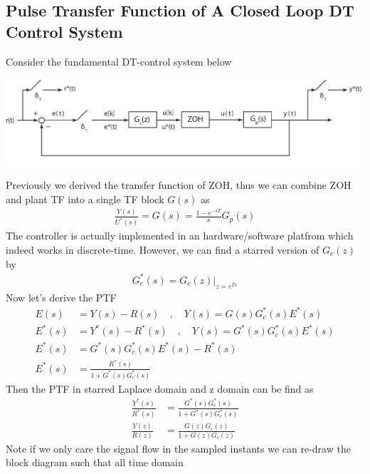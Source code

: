 \documentclass[twoside]{article}
\begin{document}
\subsection*{Pulse Transfer Function of A Closed Loop DT Control
  System}

Consider the fundamental DT-control system below 
%
    \begin{center}
\begin{minipage}[h]{\linewidth}
    \begin{center}
      \includegraphics[width=\textwidth]{digitalblock}
    \end{center}
\end{minipage}
    \end{center}
%
Previously we derived the transfer function of ZOH, thus we can
combine ZOH and plant TF into a single TF block $G(s)$ as
%
\begin{align*}
\frac{Y(s)}{U^*(s)} = G(s) = \frac{1 - e^{-sT}}{s} G_p(s)
\end{align*}
%
The controller is actually implemented in an hardware/software
platfrom which indeed works in discrete-time. However, we
can find a starred version of $G_c(z)$ by
%
\begin{align*}
  G_c^*(s) = G_c(z) |_{z = e^{Ts}}
\end{align*}
%
Now let's derive the PTF
%
\begin{align*}
E(s) &= Y(s) - R(s) \quad , \quad Y(s) = G(s) G_c^*(s) E^*(s)
\\
E^*(s) &= Y^*(s) - R^*(s) \quad , \quad Y(s) = G^*(s) G_c^*(s) E^*(s)\\
E^*(s) &= G^*(s) G_c^*(s) E^*(s) - R^*(s) 
\\
E^*(s) &= \frac{R^*(s)}{1 + G^*(s) G_c^*(s)}
\end{align*}
%
Then the PTF in starred Laplace domain and z domain can be find as
%
\begin{align*}
\frac{Y^*(s)}{R^*(s)} &= \frac{G^*(s) G_c^*(s)}{1 + G^*(s) G_c^*(s)}
\\
\frac{Y(z)}{R(z)} &= \frac{G(z) G_c(z)}{1 + G(z) G_c(z)}
\end{align*}
%
Note if we only care the signal flow in the sampled instants
we can re-draw the block diagram such that all time domain
\end{document}
